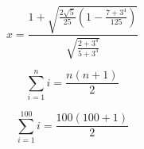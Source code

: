 \documentclass[a4paper]{article}
\begin{document}
\[ x = \frac{1 + \sqrt{\frac{2 \sqrt{5}}{25} (1 - \frac{7 + 3^4}{125})}}{\sqrt{\frac{2 + 3^4}{5 + 3^3}}} \]

\[ \sum_{i=1}^{n} i = \frac{n (n+1)}{2} \]

\[ \sum_{i=1}^{100} i = \frac{100 (100+1)}{2} \]
\end{document}
